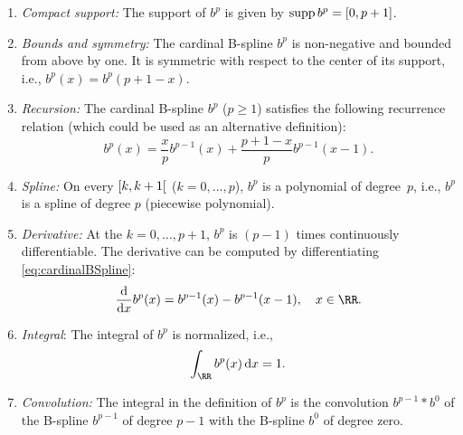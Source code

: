 \begin{enumerate}
  \item
  \emph{Compact support:}
  The support of $b^p$ is given by $\operatorname{supp} b^p = [0, p + 1]$.
  
  \item
  \emph{Bounds and symmetry:}
  The cardinal B-spline $b^p$ is non-negative and bounded from above by one.
  It is symmetric with respect to the center of its support, i.e.,
  $b^p(x) = b^p(p + 1 - x)$.
  
  \item
  \emph{Recursion:}
  The cardinal B-spline $b^p$ ($p \ge 1$) satisfies the following recurrence
  relation
  (which could be used as an alternative definition):
  \begin{equation}
    b^p(x)
    = \frac{x}{p} b^{p-1}(x) + \frac{p+1-x}{p} b^{p-1}(x-1).
  \end{equation}
  
  \item
  \emph{Spline:}
  On every  $\mathopen[k, k+1\mathclose[$
  ($k = 0, \dotsc, p$), $b^p$ is a polynomial of degree~$p$, i.e.,
  $b^p$ is a spline of degree $p$ (piecewise polynomial).
  
  \item
  \emph{Derivative:}
  At the  $k = 0, \dotsc, p + 1$,
  $b^p$ is $(p - 1)$ times continuously differentiable.
  The derivative can be computed by differentiating
  \eqref{eq:cardinalBSpline}:
  \begin{equation}
    \label{eq:cardinalBSplineDerivative}
    \frac{\diff}{\dx} b^p(x)
    = b^{p-1}(x) - b^{p-1}(x-1),\quad
    x \in \RR.
  \end{equation}
  
  \item
  \emph{Integral}:
  The integral of $b^p$ is normalized, i.e.,
  \begin{equation}
    \int_\RR b^p(x) \dx = 1.
  \end{equation}
  
  \item
  \emph{Convolution:}
  The integral in the definition of $b^p$
  is the convolution $b^{p-1} \ast b^0$ of the B-spline $b^{p-1}$
  of degree $p - 1$ with the B-spline $b^0$ of degree zero.
  

\end{enumerate}
